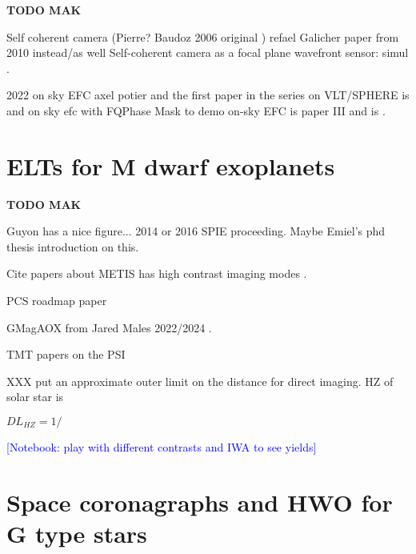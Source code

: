 \documentclass[letterpaper]{ar-1col}
\newcommand{\notebooksuggestion}[1]{\textcolor{blue}{[Notebook: #1]}}
\begin{document}
{\bf TODO MAK}






Self coherent camera (Pierre? Baudoz 2006 original \citep{Baudoz06}) refael Galicher paper from 2010 instead/as well Self-coherent camera as a focal plane wavefront sensor: simul \citep{Galicher10}.




2022 on sky EFC axel potier \citep{Potier22} and the first paper in the series on VLT/SPHERE is \citep{Potier20} and on sky efc with FQPhase Mask to demo on-sky EFC is paper III and is \citet{Galicher24}.

\section{ELTs for M dwarf exoplanets}

{\bf TODO MAK}

Guyon has a nice figure... 2014 or 2016 SPIE proceeding. Maybe Emiel's phd thesis introduction on this.

Cite papers about METIS \citep{Brandl21} has high contrast imaging modes \citep{Kenworthy16,Carlomagno20}.

PCS roadmap paper \citep{Kasper21}

GMagAOX from Jared Males 2022/2024 \citep{Males22}.

TMT papers on the PSI \citet{Jensen-Clem22,Fitzgerald22}


XXX put an approximate outer limit on the distance for direct imaging. HZ of solar star is 

$DL_{HZ} = 1/$

\notebooksuggestion{play with different contrasts and IWA to see yields}


\section{Space coronagraphs and HWO for G type stars}
\end{document}
